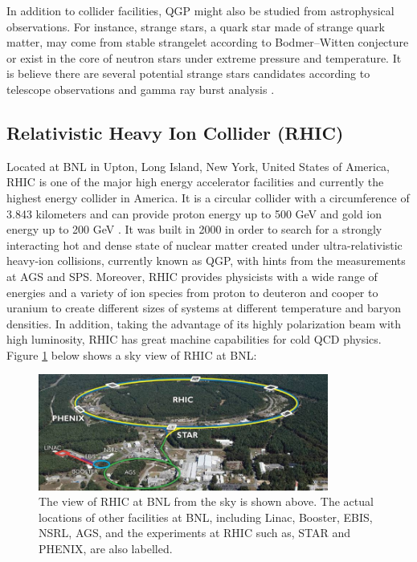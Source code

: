 In addition to collider facilities, QGP might also be studied from astrophysical observations. For instance, strange stars, a quark star made of strange quark matter, may come from stable strangelet according to Bodmer--Witten conjecture \cite{SQMReview} or exist in the core of neutron stars under extreme pressure and temperature. It is believe there are several potential strange stars candidates according to telescope observations and gamma ray burst analysis \cite{SS1,SS2,SS3}.


\subsection{Relativistic Heavy Ion Collider (RHIC)}

Located at BNL in Upton, Long Island, New York, United States of America, RHIC is one of the major high energy accelerator facilities and currently the highest energy collider in America. It is a circular collider with a circumference of 3.843 kilometers and can provide proton energy up to 500 GeV and gold ion energy up to 200 GeV \cite{RHICReport}. It was built in 2000 in order to search for a strongly interacting hot and dense state of nuclear matter created under ultra-relativistic heavy-ion collisions, currently known as QGP, with hints from the measurements at AGS and SPS. Moreover, RHIC provides physicists with a wide range of energies and a variety of ion species from proton to deuteron and cooper to uranium to create different sizes of systems at different temperature and baryon densities. In addition, taking the advantage of its highly polarization beam with high luminosity, RHIC has great machine capabilities for cold QCD physics. Figure \ref{RHIC} below shows a sky view of RHIC at BNL:


\begin{figure}[hbtp]
\begin{center}
\includegraphics[width=0.85\textwidth]{Figures/Chapter1/RHIC.jpg}
\caption{The view of RHIC at BNL from the sky is shown above. The actual locations of other facilities at BNL, including Linac, Booster, EBIS, NSRL, AGS, and the experiments at RHIC such as, STAR and PHENIX, are also labelled.}
\label{RHIC}
\end{center}
\end{figure} 

